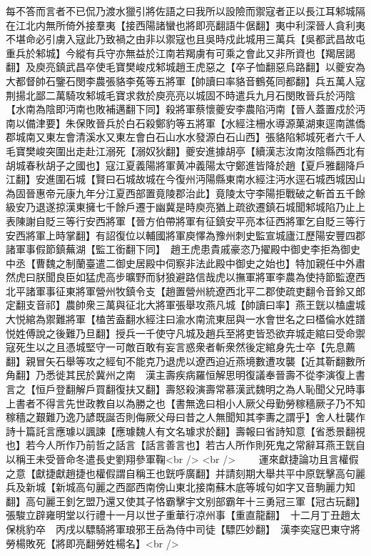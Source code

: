 每不答而言者不已侃乃渡水獵引將佐語之曰我所以設險而禦寇者正以長江耳邾城隔在江北内無所倚外接羣夷【接西陽諸蠻也將即亮翻語牛倨翻】夷中利深晉人貪利夷不堪命必引虜入寇此乃致禍之由非以禦寇也且吳時戍此城用三萬兵【吳都武昌故屯重兵於邾城】今縱有兵守亦無益於江南若羯虜有可乘之會此又非所資也【羯居謁翻】及庾亮鎮武昌卒使毛寶樊峻戍邾城趙王虎惡之【卒子恤翻惡烏路翻】以夔安為大都督帥石鑒石閔李農張貉李菟等五將軍【帥讀曰率貉音鶴菟同都翻】兵五萬人寇荆揚北鄙二萬騎攻邾城毛寶求救於庾亮亮以城固不時遣兵九月石閔敗晉兵於沔陰【水南為陰即沔南也敗補邁翻下同】殺將軍蔡懷夔安李農陷沔南【晉人蓋置戍於沔南以備津要】朱保敗晉兵於白石殺鄭豹等五將軍【水經注柵水導源菓湖東逕南譙僑郡城南又東左會清溪水又東左會白石山水水發源白石山西】張貉陷邾城死者六千人毛寶樊峻突圍出走赴江溺死【溺奴狄翻】夔安進據胡亭【續漢志汝南汝陰縣西北有胡城春秋胡子之國也】寇江夏義陽將軍黄冲義陽太守鄭進皆降於趙【夏戶雅翻降戶江翻】安進圍石城【賢曰石城故城在今復州沔陽縣東南水經注沔水逕石城西城因山為固晉惠帝元康九年分江夏西部置竟陵郡治此】竟陵太守李陽拒戰破之斬首五千餘級安乃退遂掠漢東擁七千餘戶遷于幽冀是時庾亮猶上疏欲遷鎮石城聞邾城陷乃止上表陳謝自貶三等行安西將軍【晉方伯帶將軍有征鎮安平亮本征西將軍乞自貶三等行安西將軍上時掌翻】有詔復位以輔國將軍庾懌為豫州刺史監宣城廬江歷陽安豐四郡諸軍事假節鎮蕪湖【監工銜翻下同】　趙王虎患貴戚豪恣乃擢殿中御史李拒為御史中丞【曹魏之制蘭臺遣二御史居殿中伺察非法此殿中御史之始也】特加親任中外肅然虎曰朕聞良臣如猛虎高步曠野而豺狼避路信哉虎以撫軍將軍李農為使持節監遼西北平諸軍事征東將軍營州牧鎮令支【趙置營州統遼西北平二郡使疏吏翻令音鈴又郎定翻支音祁】農帥衆三萬與征北大將軍張舉攻燕凡城【帥讀曰率】燕王皝以榼盧城大悦綰為禦難將軍【榼苦盍翻水經注曰渝水南流東屈與一水會世名之曰㯼倫水姓譜悦姓傅說之後難乃旦翻】授兵一千使守凡城及趙兵至將吏皆恐欲弃城走綰曰受命禦寇死生以之且憑城堅守一可敵百敢有妄言惑衆者斬衆然後定綰身先士卒【先息薦翻】親冒矢石舉等攻之經旬不能克乃退虎以遼西迫近燕境數遭攻襲【近其靳翻數所角翻】乃悉徙其民於冀州之南　漢主壽疾病羅恒解思明復議奉晉壽不從李演復上書言之【恒戶登翻解戶買翻復扶又翻】壽怒殺演壽常慕漢武魏明之為人恥聞父兄時事上書者不得言先世政教自以為勝之也【書無逸曰相小人厥父母勤勞稼穡厥子乃不知稼穡之艱難乃逸乃諺既誕否則侮厥父母曰昔之人無聞知其李夀之謂乎】舍人杜襲作詩十篇託言應璩以諷諫【應璩魏人有文名璩求於翻】壽報曰省詩知意【省悉景翻視也】若今人所作乃前哲之話言【話言善言也】若古人所作則死鬼之常辭耳燕王皝自以稱王未受晉命冬遣長史劉翔參軍鞠<br />
<br />
　　運來獻捷論功且言權假之意【獻捷獻趙捷也權假謂自稱王也皝呼廣翻】并請刻期大舉共平中原皝擊高句麗兵及新城【新城高句麗之西鄙西南傍山東北接南蘇木底等城句如字又音駒麗力知翻】高句麗王釗乞盟乃還又使其子恪霸擊宇文别部霸年十三勇冠三軍【冠古玩翻】　張駿立辟雍明堂以行禮十一月以世子重華行凉州事【重直龍翻】　十二月丁丑趙太保桃豹卒　丙戌以驃騎將軍琅邪王岳為侍中司徒【驃匹妙翻】　漢李奕寇巴東守將勞楊敗死【將即亮翻勞姓楊名】<br />
